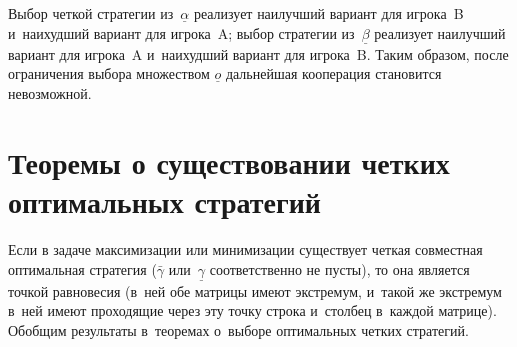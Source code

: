 \documentclass[twoside]{article}
\begin{document}
Выбор четкой стратегии из~$\underline\alpha$ реализует наилучший вариант для игрока~B и~наихудший
вариант для игрока~A; выбор стратегии из~$\underline\beta$ реализует наилучший вариант для игрока~A
и~наихудший вариант для игрока~B. Таким образом, после ограничения выбора множеством $\underline o$
дальнейшая кооперация становится невозможной.

\section{Теоремы о существовании четких\\ оптимальных стратегий}
Если в задаче максимизации или минимизации существует четкая совместная оптимальная стратегия
($\bar\gamma$ или~$\underline\gamma$ соответственно не пусты), то она является точкой равновесия
(в~ней обе матрицы имеют экстремум, и~такой же экстремум в~ней имеют проходящие через эту точку
строка и~столбец в~каждой матрице). Обобщим результаты в~теоремах о~выборе оптимальных четких
стратегий.
\end{document}
